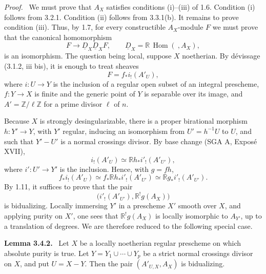 \documentclass[11pt]{article}
\providecommand{\ZZ}{\mathbb{Z}}
\newenvironment{statement}[1]{\par\medskip\noindent\textbf{#1.}\ }{\par\medskip}
\newenvironment{prooftext}[1][Proof]{\par\noindent\emph{#1.}\ }{\par\medskip}
\DeclareMathOperator{\Hom}{Hom}
\providecommand{\Hom}{\operatorname{Hom}}
\providecommand{\Hom}{\operatorname{Hom}}
\begin{document}
\begin{prooftext}
We must prove that $A_X$ satisfies conditions (i)--(iii) of 1.6. Condition (i) follows from 3.2.1. Condition (ii) follows from 3.3.1(b). It remains to prove condition (iii). Thus, by 1.7, for every constructible $A_X$-module $F$ we must prove that the canonical homomorphism
\[
   F\longrightarrow \underline D_X\underline D_XF,
   \qquad \underline D_X=\mathbb{R}\,\Hom(\ ,A_X),
\]
is an isomorphism. The question being local, suppose $X$ noetherian. By dévissage (3.1.2, iii bis), it is enough to treat sheaves
\[
   F=f_*i_!(A'_U),
\]
where $i:U\to Y$ is the inclusion of a regular open subset of an integral prescheme, $f:Y\to X$ is finite and the generic point of $Y$ is separable over its image, and $A'=\ZZ/\ell\ZZ$ for a prime divisor $\ell$ of $n$.

Because $X$ is strongly desingularizable, there is a proper birational morphism $h:Y'\to Y$, with $Y'$ regular, inducing an isomorphism from $U'=h^{-1}U$ to $U$, and such that $Y'-U'$ is a normal crossings divisor. By base change (SGA A, Exposé XVII),
\[
   i_!(A'_U)\simeq\mathbb{R} h_*i'_!(A'_{U'}),
\]
where $i':U'\to Y'$ is the inclusion. Hence, with $g=fh$,
\[
   f_*i_!(A'_U)
     \simeq f_*\mathbb{R} h_*i'_!(A'_{U'})
     \simeq \mathbb{R} g_*i'_!(A'_{U'}).
\]
By 1.11, it suffices to prove that the pair
\[
   \bigl(i'_!(A'_{U'}),\mathbb{R}^!g(A_X)\bigr)
\]
is bidualizing. Locally immersing $Y'$ in a prescheme $X'$ smooth over $X$, and applying purity on $X'$, one sees that $\mathbb{R}^!g(A_X)$ is locally isomorphic to $A_{Y'}$, up to a translation of degrees. We are therefore reduced to the following special case.
\end{prooftext}

\begin{statement}{Lemma 3.4.2}
Let $X$ be a locally noetherian regular prescheme on which absolute purity is true. Let $Y=Y_1\cup\cdots\cup Y_p$ be a strict normal crossings divisor on $X$, and put $U=X-Y$. Then the pair $(A'_{U,X},A_X)$ is bidualizing.
\end{statement}
\end{document}

